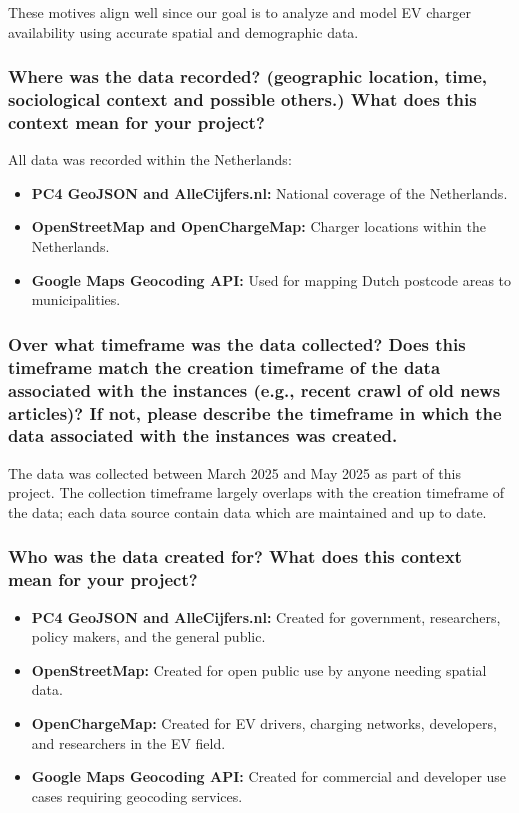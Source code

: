 \documentclass{article}
\newcommand{\question}[1]{#1}
\begin{document}
These motives align well since our goal is to analyze and model EV charger availability using accurate spatial and demographic data.

\question{\subsubsection*{Where was the data recorded? (geographic location, time, sociological context and possible others.) What does this context mean for your project?}}

All data was recorded within the Netherlands:

\begin{itemize}
	\item \textbf{PC4 GeoJSON and AlleCijfers.nl:} National coverage of the Netherlands.
	\item \textbf{OpenStreetMap and OpenChargeMap:} Charger locations within the Netherlands.
	\item \textbf{Google Maps Geocoding API:} Used for mapping Dutch postcode areas to municipalities.
\end{itemize}

\question{\subsubsection*{Over what timeframe was the data collected? Does this timeframe
		match the creation timeframe of the data associated with the instances (e.g., recent crawl of old news articles)? If not, please describe the timeframe in which the data associated with the instances was created.}}
The data was collected between March 2025 and May 2025 as part of this project. The collection timeframe largely overlaps with the creation timeframe of the data; each data source contain data which are maintained and up to date.

\question{\subsubsection*{Who was the data created for? What does this context mean for your project?}}

\begin{itemize}
	\item \textbf{PC4 GeoJSON and AlleCijfers.nl:} Created for government, researchers, policy makers, and the general public.
	\item \textbf{OpenStreetMap:} Created for open public use by anyone needing spatial data.
	\item \textbf{OpenChargeMap:} Created for EV drivers, charging networks, developers, and researchers in the EV field.
	\item \textbf{Google Maps Geocoding API:} Created for commercial and developer use cases requiring geocoding services.
\end{itemize}
\end{document}
